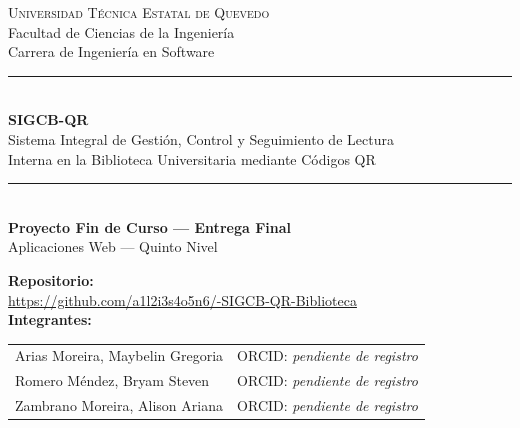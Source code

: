 \documentclass[12pt,a4paper]{article}
\begin{document}
\begin{center}
    {\large\scshape Universidad Técnica Estatal de Quevedo}\\[0.12cm]
    {\normalsize Facultad de Ciencias de la Ingeniería}\\[0.12cm]
    {\normalsize Carrera de Ingeniería en Software}\\[0.18cm]

    \rule{\textwidth}{0.8pt}\\[0.18cm]
    {\LARGE\bfseries SIGCB-QR}\\[0.18cm]
    {\large Sistema Integral de Gestión, Control y Seguimiento de Lectura\\
     Interna en la Biblioteca Universitaria mediante Códigos QR}\\[0.3cm]
    \rule{\textwidth}{0.8pt}\\[0.18cm]

    {\normalsize\bfseries Proyecto Fin de Curso --- Entrega Final}\\[0.2cm]
    {\normalsize Aplicaciones Web --- Quinto Nivel}\\[0.7cm]
\end{center}

{\bfseries Repositorio:}\\[0.12cm]
\newlength{\anchourl}
\settowidth{\anchourl}{\small\ttfamily https://github.com/a1l2i3s4o5n6/-SIGCB-QR-Biblioteca}
\ifdim\anchourl>\textwidth
    \GenericError{}{ERROR: la URL del repositorio no cabe en una sola linea}{}{}
\fi
{\small\url{https://github.com/a1l2i3s4o5n6/-SIGCB-QR-Biblioteca}}\\[0.18cm]

{\bfseries Integrantes:}\\[0.18cm]
\begin{tabular}{@{}p{7.2cm}p{6.9cm}@{}}
    Arias Moreira, Maybelin Gregoria & ORCID: \textit{pendiente de registro} \\[0.12cm]
    Romero Méndez, Bryam Steven      & ORCID: \textit{pendiente de registro} \\[0.12cm]
    Zambrano Moreira, Alison Ariana  & ORCID: \textit{pendiente de registro} \\
\end{tabular}\\[0.45cm]
\end{document}
